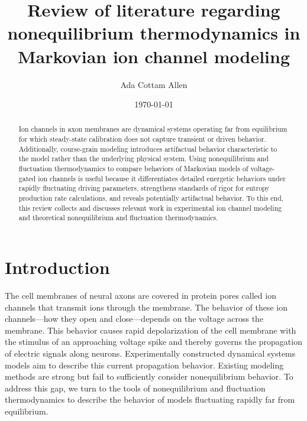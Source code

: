 \documentclass[%
 aip,
 amsmath,amssymb,
 reprint,%
]{revtex4-1}
\begin{document}

\title[Lit. review: nonequilibrium thermodynamics of ion channels]{Review of literature regarding nonequilibrium thermodynamics in Markovian ion channel modeling}
\author{Ada Cottam Allen}

\date{\today}

\begin{abstract}
Ion channels in axon membranes are dynamical systems operating far from equilibrium for which steady-state calibration does not capture transient or driven behavior. Additionally, course-grain modeling introduces artifactual behavior characteristic to the model rather than the underlying physical system. Using nonequilibrium and fluctuation thermodynamics to compare behaviors of Markovian models of voltage-gated ion channels is useful because it differentiates detailed energetic behaviors under rapidly fluctuating driving parameters, strengthens standards of rigor for entropy production rate calculations, and reveals potentially artifactual behavior. To this end, this review collects and discusses relevant work in experimental ion channel modeling and theoretical nonequilibrium and fluctuation thermodynamics.
\end{abstract}

\maketitle

\section{Introduction}
The cell membranes of neural axons are covered in protein pores called ion channels that transmit ions through the membrane. The behavior of these ion channels---how they open and close---depends on the voltage across the membrane. This behavior causes rapid depolarization of the cell membrane with the stimulus of an approaching voltage spike and thereby governs the propagation of electric signals along neurons. Experimentally constructed dynamical systems models aim to describe this current propagation behavior. Existing modeling methods are strong but fail to sufficiently consider nonequilibrium behavior. To address this gap, we turn to the tools of nonequilibrium and fluctuation thermodynamics to describe the behavior of models fluctuating rapidly far from equilibrium.
\end{document}
